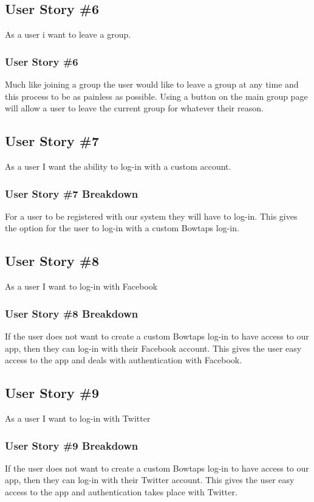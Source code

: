 \subsection{User Story \#6} 
As a user i want to leave a group.

\subsubsection{User Story \#6}
Much like joining a group the user would like to leave a group at any time and this process to be as painless as possible.  Using a button on the main group page will allow a user to leave the current group for whatever their reason.

\subsection{User Story \#7} 
As a user I want the ability to log-in with a custom account.

\subsubsection{User Story \#7 Breakdown}
For a user to be registered with our system they will have to log-in.  This gives the option for the user to log-in with a custom Bowtaps log-in.

\subsection{User Story \#8}
As a user I want to log-in with Facebook

\subsubsection{User Story \#8 Breakdown}
If the user does not want to create a custom Bowtaps log-in to have access to our app,  then they can log-in with their Facebook account.  This gives the user easy access to the app and deals with authentication with Facebook.

\subsection{User Story \#9}
As a user I want to log-in with Twitter
\subsubsection{User Story \#9 Breakdown}
If the user does not want to create a custom Bowtaps log-in to have access to our app, then they can log-in with their Twitter account.  This gives the user easy access to the app and authentication takes place with Twitter.
